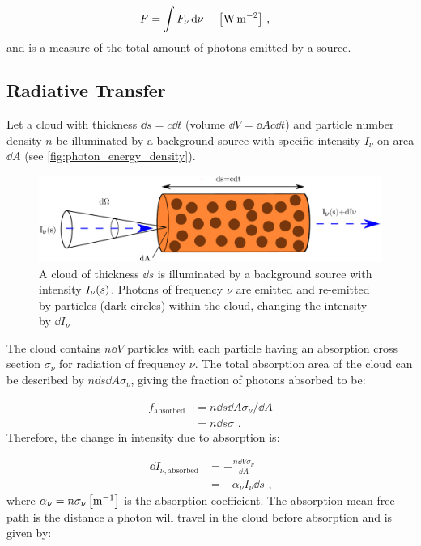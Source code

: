 \begin{equation}
	\begin{aligned}
		F&=\int F_\nu \dd{\nu}\,\quad\qty[\si{\watt\per\meter\squared}]\text{ ,}
	\end{aligned}
\end{equation}
\noindent and is a measure of the total amount of photons emitted by a source.

\subsection{Radiative Transfer}

Let a cloud with thickness $\dd{s}=c\dd{t}$ (volume $\dd{V}=\dd{A}c\dd{t}$) and particle number density $n$ be illuminated by a background source with specific intensity $I_\nu$ on area $\dd{A}$ (see \autoref{fig:photon_energy_density}).

\begin{figure}[H]
	\centering
	\includegraphics[width=\textwidth]{06_Interstellar_Medium/Images/Theory/radiative_transfer.pdf}
	\caption{A cloud of thickness $\dd{s}$ is illuminated by a background source with intensity $I_\nu\qty(s)$. Photons of frequency $\nu$ are emitted and re-emitted by particles (dark circles) within the cloud, changing the intensity by $\dd{I_\nu}$}
	\label{fig:photon_energy_density}
\end{figure}
\noindent The cloud contains $n\dd{V}$ particles with each particle having an absorption cross section $\sigma_\nu$ for radiation of frequency $\nu$. The total absorption area of the cloud can be described by $n\dd{s}\dd{A}\sigma_\nu$, giving the fraction of photons absorbed to be:

\begin{equation}
    \begin{aligned}
        f_\text{absorbed}&=n\dd{s}\dd{A}\sigma_\nu/\dd{A} \\
        &=n\dd{s}\sigma \text{ .}
    \end{aligned}
\end{equation}
\noindent Therefore, the change in intensity due to absorption is:

\begin{equation}
    \begin{aligned}
        \dd{I_{\nu,\text{absorbed}}}&=- \frac{n\dd{V}\sigma_\nu}{\dd{A}} \\
        &= - \alpha_\nu I_\nu \dd{s}\text{ ,}
    \end{aligned}
\end{equation}
\noindent where $\alpha_\nu=n\sigma_\nu\,\qty[\si{\per\meter}]$ is the absorption coefficient. The absorption mean free path is the distance a photon will travel in the cloud before absorption and is given by:

